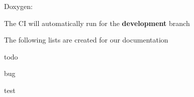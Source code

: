 \begin{DoxyEnumerate}
\begin{DoxyEnumerate}
\begin{DoxyEnumerate}
\begin{DoxyItemize}
\end{DoxyItemize}
\end{DoxyEnumerate}
\end{DoxyEnumerate}
\end{DoxyEnumerate}
\begin{DoxyEnumerate}
\item Doxygen\+:
\begin{DoxyItemize}
\item The CI will automatically run for the {\bfseries development} branch
\item The following lists are created for our documentation
\begin{DoxyItemize}
\item todo
\item bug
\item test
\end{DoxyItemize}
\end{DoxyItemize}
\end{DoxyEnumerate}

